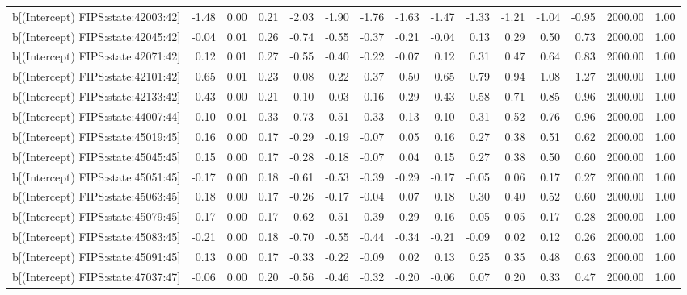 \begin{table}[ht]
\begin{tabular}{rrrrrrrrrrrrrrr}
  b[(Intercept) FIPS:state:42003:42] & -1.48 & 0.00 & 0.21 & -2.03 & -1.90 & -1.76 & -1.63 & -1.47 & -1.33 & -1.21 & -1.04 & -0.95 & 2000.00 & 1.00 \\ 
  b[(Intercept) FIPS:state:42045:42] & -0.04 & 0.01 & 0.26 & -0.74 & -0.55 & -0.37 & -0.21 & -0.04 & 0.13 & 0.29 & 0.50 & 0.73 & 2000.00 & 1.00 \\ 
  b[(Intercept) FIPS:state:42071:42] & 0.12 & 0.01 & 0.27 & -0.55 & -0.40 & -0.22 & -0.07 & 0.12 & 0.31 & 0.47 & 0.64 & 0.83 & 2000.00 & 1.00 \\ 
  b[(Intercept) FIPS:state:42101:42] & 0.65 & 0.01 & 0.23 & 0.08 & 0.22 & 0.37 & 0.50 & 0.65 & 0.79 & 0.94 & 1.08 & 1.27 & 2000.00 & 1.00 \\ 
  b[(Intercept) FIPS:state:42133:42] & 0.43 & 0.00 & 0.21 & -0.10 & 0.03 & 0.16 & 0.29 & 0.43 & 0.58 & 0.71 & 0.85 & 0.96 & 2000.00 & 1.00 \\ 
  b[(Intercept) FIPS:state:44007:44] & 0.10 & 0.01 & 0.33 & -0.73 & -0.51 & -0.33 & -0.13 & 0.10 & 0.31 & 0.52 & 0.76 & 0.96 & 2000.00 & 1.00 \\ 
  b[(Intercept) FIPS:state:45019:45] & 0.16 & 0.00 & 0.17 & -0.29 & -0.19 & -0.07 & 0.05 & 0.16 & 0.27 & 0.38 & 0.51 & 0.62 & 2000.00 & 1.00 \\ 
  b[(Intercept) FIPS:state:45045:45] & 0.15 & 0.00 & 0.17 & -0.28 & -0.18 & -0.07 & 0.04 & 0.15 & 0.27 & 0.38 & 0.50 & 0.60 & 2000.00 & 1.00 \\ 
  b[(Intercept) FIPS:state:45051:45] & -0.17 & 0.00 & 0.18 & -0.61 & -0.53 & -0.39 & -0.29 & -0.17 & -0.05 & 0.06 & 0.17 & 0.27 & 2000.00 & 1.00 \\ 
  b[(Intercept) FIPS:state:45063:45] & 0.18 & 0.00 & 0.17 & -0.26 & -0.17 & -0.04 & 0.07 & 0.18 & 0.30 & 0.40 & 0.52 & 0.60 & 2000.00 & 1.00 \\ 
  b[(Intercept) FIPS:state:45079:45] & -0.17 & 0.00 & 0.17 & -0.62 & -0.51 & -0.39 & -0.29 & -0.16 & -0.05 & 0.05 & 0.17 & 0.28 & 2000.00 & 1.00 \\ 
  b[(Intercept) FIPS:state:45083:45] & -0.21 & 0.00 & 0.18 & -0.70 & -0.55 & -0.44 & -0.34 & -0.21 & -0.09 & 0.02 & 0.12 & 0.26 & 2000.00 & 1.00 \\ 
  b[(Intercept) FIPS:state:45091:45] & 0.13 & 0.00 & 0.17 & -0.33 & -0.22 & -0.09 & 0.02 & 0.13 & 0.25 & 0.35 & 0.48 & 0.63 & 2000.00 & 1.00 \\ 
  b[(Intercept) FIPS:state:47037:47] & -0.06 & 0.00 & 0.20 & -0.56 & -0.46 & -0.32 & -0.20 & -0.06 & 0.07 & 0.20 & 0.33 & 0.47 & 2000.00 & 1.00 \\ 

\end{tabular}
\end{table}
